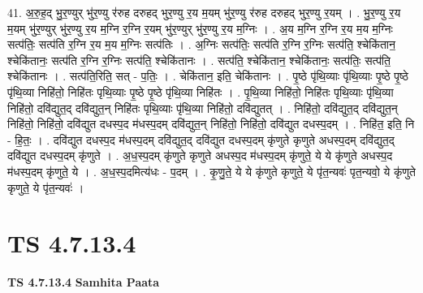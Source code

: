 \documentclass[17pt]{extarticle}
\begin{document}
41. अ॒रु॒ह॒द् भु॒र॒ण्युर् भु॑र॒ण्यु र॑रुह दरुहद् भुर॒ण्यु र॒य म॒यम् भु॑र॒ण्यु र॑रुह दरुहद् भुर॒ण्यु र॒यम् । . भु॒र॒ण्यु र॒य म॒यम् भु॑र॒ण्युर् भु॑र॒ण्यु र॒य म॒ग्नि र॒ग्नि र॒यम् भु॑र॒ण्युर् भु॑र॒ण्यु र॒य म॒ग्निः । . अ॒य म॒ग्नि र॒ग्नि र॒य म॒य म॒ग्निः सत्प॑तिः॒ सत्प॑ति र॒ग्नि र॒य म॒य म॒ग्निः सत्प॑तिः । . अ॒ग्निः सत्प॑तिः॒ सत्प॑ति र॒ग्नि र॒ग्निः सत्प॑ति॒ श्चेकि॑तान॒ श्चेकि॑तानः॒ सत्प॑ति र॒ग्नि र॒ग्निः सत्प॑ति॒ श्चेकि॑तानः । . सत्प॑ति॒ श्चेकि॑तान॒ श्चेकि॑तानः॒ सत्प॑तिः॒ सत्प॑ति॒ श्चेकि॑तानः । . सत्प॑ति॒रिति॒ सत् - प॒तिः॒ । . चेकि॑तान॒ इति॒ चेकि॑तानः । . पृ॒ष्ठे पृ॑थि॒व्याः पृ॑थि॒व्याः पृ॒ष्ठे पृ॒ष्ठे पृ॑थि॒व्या निहि॑तो॒ निहि॑तः पृथि॒व्याः पृ॒ष्ठे पृ॒ष्ठे पृ॑थि॒व्या निहि॑तः । . पृ॒थि॒व्या निहि॑तो॒ निहि॑तः पृथि॒व्याः पृ॑थि॒व्या निहि॑तो॒ दवि॑द्युत॒द् दवि॑द्युत॒न् निहि॑तः पृथि॒व्याः पृ॑थि॒व्या निहि॑तो॒ दवि॑द्युतत् । . निहि॑तो॒ दवि॑द्युत॒द् दवि॑द्युत॒न् निहि॑तो॒ निहि॑तो॒ दवि॑द्युत दधस्प॒द म॑धस्प॒दम् दवि॑द्युत॒न् निहि॑तो॒ निहि॑तो॒ दवि॑द्युत दधस्प॒दम् । . निहि॑त॒ इति॒ नि - हि॒तः॒ । . दवि॑द्युत दधस्प॒द म॑धस्प॒दम् दवि॑द्युत॒द् दवि॑द्युत दधस्प॒दम् कृ॑णुते कृणुते अधस्प॒दम् दवि॑द्युत॒द् दवि॑द्युत दधस्प॒दम् कृ॑णुते । . अ॒ध॒स्प॒दम् कृ॑णुते कृणुते अधस्प॒द म॑धस्प॒दम् कृ॑णुते॒ ये ये कृ॑णुते अधस्प॒द म॑धस्प॒दम् कृ॑णुते॒ ये । . अ॒ध॒स्प॒दमित्य॑धः - प॒दम् । . कृ॒णु॒ते॒ ये ये कृ॑णुते कृणुते॒ ये पृ॑त॒न्यवः॑ पृत॒न्यवो॒ ये कृ॑णुते कृणुते॒ ये पृ॑त॒न्यवः॑ । \newline
\pagebreak
{}

\section{ TS 4.7.13.4 }

\textbf{TS 4.7.13.4 } \newline
\textbf{Samhita Paata} \newline
\end{document}

